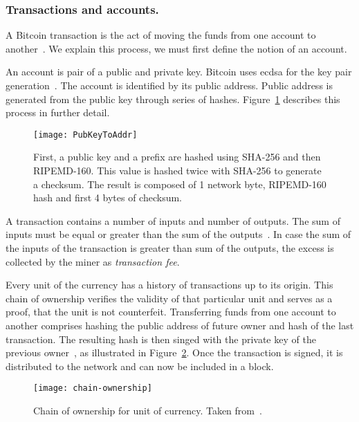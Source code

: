 \subsubsection{Transactions and accounts.}
A Bitcoin transaction is the act of moving the funds from one account to another~\cite{Judmayer2017BlocksMechanisms}. We explain this process, we must first define the notion of an account.

An account is pair of a public and private key. Bitcoin uses \acrfull{ecdsa} for the key pair generation~\cite{Decker2013InformationNetwork}. The account is identified by its public address. Public address is generated from the public key through series of hashes. Figure~\ref{fig:public-address-gen} describes this process in further detail.
% 
\begin{figure}[p]
    \centering
    \texttt{[image: PubKeyToAddr]}
    \caption{First, a public key and a prefix are hashed using SHA-256 and then RIPEMD-160. This value is hashed twice with SHA-256 to generate a checksum. The result is composed of 1 network byte, RIPEMD-160 hash and first 4 bytes of checksum.}
    \label{fig:public-address-gen}
\end{figure}

A transaction contains a number of inputs and number of outputs. The sum of inputs must be equal or greater than the sum of the outputs~\cite[p. 27]{Judmayer2017BlocksMechanisms}. In case the sum of the inputs of the transaction is greater than sum of the outputs, the excess is collected by the miner as \textit{transaction fee}.

Every unit of the currency has a history of transactions up to its origin. This chain of ownership verifies the validity of that particular unit and serves as a proof, that the unit is not counterfeit. Transferring funds from one account to another comprises hashing the public address of future owner and hash of the last transaction. The resulting hash is then singed with the private key of the previous owner~\cite{NakamotoBitcoin:System}, as illustrated in Figure~\ref{fig:chain-ownership}. Once the transaction is signed, it is distributed to the network and can now be included in a block.
% 
\begin{figure}[ht]
    \centering
    \texttt{[image: chain-ownership]}
    \caption{Chain of ownership for unit of currency. Taken from~\cite{NakamotoBitcoin:System}.}
    \label{fig:chain-ownership}
\end{figure}

